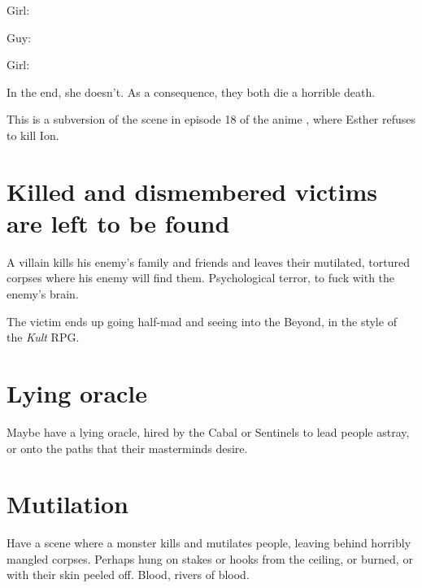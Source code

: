 Girl: 

Guy: 

Girl: 

In the end, she doesn't. As a consequence, they both die a horrible death. 

This is a subversion of the scene in episode 18 of the anime \cite{Anime:TrinityBlood}, where Esther refuses to kill Ion.















\section{Killed and dismembered victims are left to be found}
A villain kills his enemy's family and friends and leaves their mutilated, tortured corpses where his enemy will find them. Psychological terror, to fuck with the enemy's brain. 

The victim ends up going half-mad and seeing into the Beyond, in the style of the \emph{Kult} RPG. 















\section{Lying oracle}
Maybe have a lying oracle, hired by the Cabal or Sentinels to lead people astray, or onto the paths that their masterminds desire. 















\section{Mutilation}
Have a scene where a monster kills and mutilates people, leaving behind horribly mangled corpses. Perhaps hung on stakes or hooks from the ceiling, or burned, or with their skin peeled off. Blood, rivers of blood.















